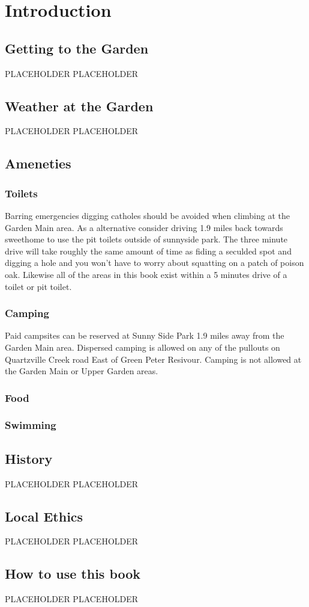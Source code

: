 \chapter{Introduction}
\lhead{\textcolor{\chapterColor}{\rule[-2pt]{\textwidth}{15pt}}}
\section{Getting to the Garden}
PLACEHOLDER
\lipsum[1]
PLACEHOLDER
\section{Weather at the Garden}
PLACEHOLDER
\lipsum[1]
PLACEHOLDER
\section{Ameneties}
\subsection*{Toilets}
Barring emergencies digging catholes should be avoided when climbing at the Garden Main area. As a alternative consider driving 1.9 miles back towards sweethome to use the pit toilets outside of sunnyside park. The three minute drive will take roughly the same amount of time as fiding a seculded spot and digging a hole and you won't have to worry about squatting on a patch of poison oak. Likewise all of the areas in this book exist within a 5 minutes drive of a toilet or pit toilet. 
\subsection*{Camping}
Paid campsites can be reserved at Sunny Side Park 1.9 miles away from the Garden Main area. Dispersed camping is allowed on any of the pullouts on Quartzville Creek road East of Green Peter Resivour. Camping is not allowed at the Garden Main or Upper Garden areas.
\subsection*{Food}
\subsection*{Swimming}
\section{History}
PLACEHOLDER
\lipsum[1]
PLACEHOLDER
\section{Local Ethics}
PLACEHOLDER
\lipsum[1]
PLACEHOLDER
\section{How to use this book}
PLACEHOLDER
\lipsum[1]
PLACEHOLDER                                                                           

\clearpage